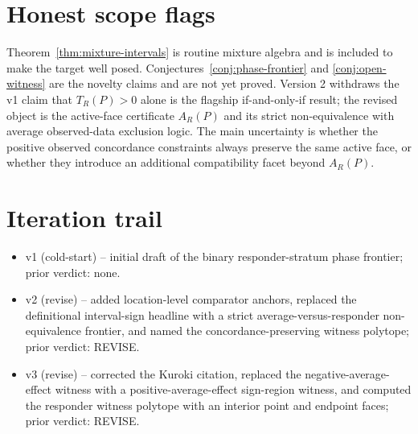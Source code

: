 \documentclass[11pt]{article}
\theoremstyle{definition}
\theoremstyle{plain}
\theoremstyle{remark}
\begin{document}
\section{Honest scope flags}
Theorem~\ref{thm:mixture-intervals} is routine mixture algebra and is included to make the target well posed. Conjectures~\ref{conj:phase-frontier} and \ref{conj:open-witness} are the novelty claims and are not yet proved. Version 2 withdraws the v1 claim that \(T_R(P)>0\) alone is the flagship if-and-only-if result; the revised object is the active-face certificate \(A_R(P)\) and its strict non-equivalence with average observed-data exclusion logic. The main uncertainty is whether the positive observed concordance constraints always preserve the same active face, or whether they introduce an additional compatibility facet beyond \(A_R(P)\).

\section{Iteration trail}
\begin{itemize}[leftmargin=*]
\item v1 (cold-start) -- initial draft of the binary responder-stratum phase frontier; prior verdict: none.
\item v2 (revise) -- added location-level comparator anchors, replaced the definitional interval-sign headline with a strict average-versus-responder non-equivalence frontier, and named the concordance-preserving witness polytope; prior verdict: REVISE.
\item v3 (revise) -- corrected the Kuroki citation, replaced the negative-average-effect witness with a positive-average-effect sign-region witness, and computed the responder witness polytope with an interior point and endpoint faces; prior verdict: REVISE.
\end{itemize}
\end{document}

